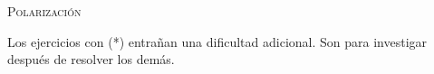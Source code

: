 \documentclass[11pt, spanish, a4paper, twoside]{article}
\begin{document}
\begin{center}
	\textsc{\LARGE Polarización}
\end{center}

Los ejercicios con (*) entrañan una dificultad adicional. Son para investigar después de resolver los demás.


\begin{enumerate}

}




\end{enumerate}
\end{document}
